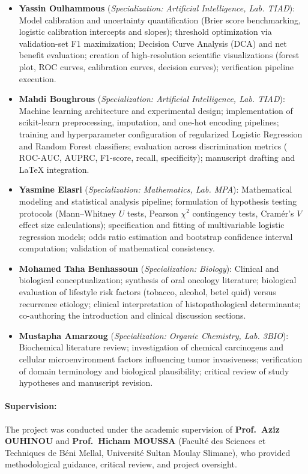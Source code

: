 \documentclass[11pt,a4paper]{article}
\newcommand{\ROC}{\text{ROC-AUC}}
\newcommand{\AUPRC}{\text{AUPRC}}
\begin{document}
\begin{itemize}
    \item \textbf{Yassin Oulhammous} (\textit{Specialization: Artificial Intelligence, Lab. TIAD}): Model calibration and uncertainty quantification (Brier score benchmarking, logistic calibration intercepts and slopes); threshold optimization via validation-set F1 maximization; Decision Curve Analysis (DCA) and net benefit evaluation; creation of high-resolution scientific visualizations (forest plot, ROC curves, calibration curves, decision curves); verification pipeline execution.
    
    \item \textbf{Mahdi Boughrous} (\textit{Specialization: Artificial Intelligence, Lab. TIAD}): Machine learning architecture and experimental design; implementation of scikit-learn preprocessing, imputation, and one-hot encoding pipelines; training and hyperparameter configuration of regularized Logistic Regression and Random Forest classifiers; evaluation across discrimination metrics ($\ROC{}$, $\AUPRC{}$, F1-score, recall, specificity); manuscript drafting and \LaTeX{} integration.
    
    \item \textbf{Yasmine Elasri} (\textit{Specialization: Mathematics, Lab. MPA}): Mathematical modeling and statistical analysis pipeline; formulation of hypothesis testing protocols (Mann--Whitney $U$ tests, Pearson $\chi^2$ contingency tests, Cram\'er's $V$ effect size calculations); specification and fitting of multivariable logistic regression models; odds ratio estimation and bootstrap confidence interval computation; validation of mathematical consistency.
    
    \item \textbf{Mohamed Taha Benhassoun} (\textit{Specialization: Biology}): Clinical and biological conceptualization; synthesis of oral oncology literature; biological evaluation of lifestyle risk factors (tobacco, alcohol, betel quid) versus recurrence etiology; clinical interpretation of histopathological determinants; co-authoring the introduction and clinical discussion sections.
    
    \item \textbf{Mustapha Amarzoug} (\textit{Specialization: Organic Chemistry, Lab. 3BIO}): Biochemical literature review; investigation of chemical carcinogens and cellular microenvironment factors influencing tumor invasiveness; verification of domain terminology and biological plausibility; critical review of study hypotheses and manuscript revision.
\end{itemize}

\paragraph{Supervision:} The project was conducted under the academic supervision of \textbf{Prof.~Aziz OUHINOU} and \textbf{Prof.~Hicham MOUSSA} (Facult\'e des Sciences et Techniques de B\'eni Mellal, Universit\'e Sultan Moulay Slimane), who provided methodological guidance, critical review, and project oversight.



\end{document}
